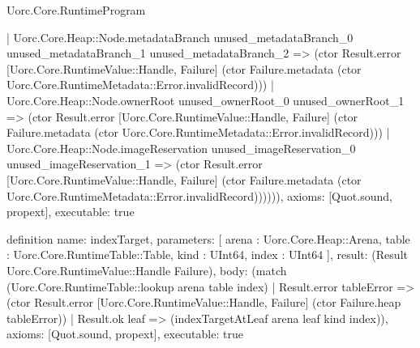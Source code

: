 \begin{lexlean}{Uorc.Core.RuntimeProgram}
\begin{semanticmodule}
{      | Uorc.Core.Heap::Node.metadataBranch unused_metadataBranch_0 unused_metadataBranch_1 unused_metadataBranch_2 => (ctor Result.error [Uorc.Core.RuntimeValue::Handle, Failure] (ctor Failure.metadata (ctor Uorc.Core.RuntimeMetadata::Error.invalidRecord)))
      | Uorc.Core.Heap::Node.ownerRoot unused_ownerRoot_0 unused_ownerRoot_1 => (ctor Result.error [Uorc.Core.RuntimeValue::Handle, Failure] (ctor Failure.metadata (ctor Uorc.Core.RuntimeMetadata::Error.invalidRecord)))
      | Uorc.Core.Heap::Node.imageReservation unused_imageReservation_0 unused_imageReservation_1 => (ctor Result.error [Uorc.Core.RuntimeValue::Handle, Failure] (ctor Failure.metadata (ctor Uorc.Core.RuntimeMetadata::Error.invalidRecord)))))),
  axioms: [Quot.sound, propext],
  executable: true
}

definition{
  name: indexTarget,
  parameters: [
    arena : Uorc.Core.Heap::Arena,
    table : Uorc.Core.RuntimeTable::Table,
    kind : UInt64,
    index : UInt64
  ],
  result: (Result Uorc.Core.RuntimeValue::Handle Failure),
  body: (match (Uorc.Core.RuntimeTable::lookup arena table index)
    | Result.error tableError => (ctor Result.error [Uorc.Core.RuntimeValue::Handle, Failure] (ctor Failure.heap tableError))
    | Result.ok leaf => (indexTargetAtLeaf arena leaf kind index)),
  axioms: [Quot.sound, propext],
  executable: true
}


\end{semanticmodule}
\end{lexlean}

